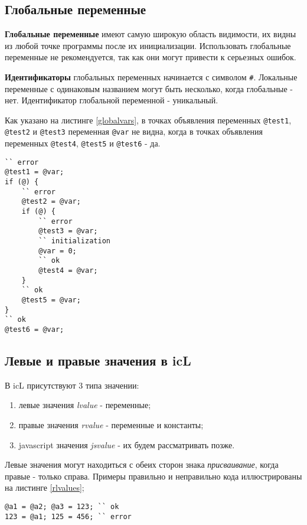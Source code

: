 \documentclass[a4paper, 14pt]{extarticle}
\newenvironment{icEnum}
	{ \begin{enumerate}[noitemsep,nolistsep] }
	{ \end{enumerate} }
\begin{document}
\subsection{Глобальные переменные}

\textbf{Глобальные переменные} имеют самую широкую область видимости, их видны из любой точке программы после их инициализации. Использовать глобальные переменные не рекомендуется, так как они могут привести к серьезных ошибок.

{\bf Идентификаторы} глобальных переменных начинается с символом {\color{blue2}\lstinline`#`}. Локальные переменные с одинаковым названием могут быть несколько, когда глобальные - нет. Идентификатор глобальной переменной - уникальный.

Как указано на листинге \ref{globalvars}, в точках объявления переменных \lstinline`@test1`, \lstinline`@test2` и \lstinline`@test3` переменная \lstinline`@var` не видна, когда в точках объявления переменных \lstinline`@test4`, \lstinline`@test5` и \lstinline`@test6` - да.

\begin{lstlisting}[caption=Область видимости глобальных перемен, label=globalvars]
`` error
@test1 = @var;
if (@) {
	`` error
	@test2 = @var;
	if (@) {
		`` error
		@test3 = @var;
		`` initialization
		@var = 0;
		`` ok
		@test4 = @var;
	}
	`` ok
	@test5 = @var;
}
`` ok
@test6 = @var;
\end{lstlisting}

\subsection{Левые и правые значения в icL}

В icL присутствуют 3 типа значении:

\begin{icEnum}
\item
	левые значения {\it lvalue} - переменные;
\item
	правые значения {\it rvalue} - переменные и константы;
\item
	javascript значения {\it jsvalue} - их будем рассматривать позже.
\end{icEnum}

Левые значения могут находиться с обеих сторон знака {\it присваивание}, когда правые - только справа. Примеры правильно и неправильно кода иллюстрированы на листинге \ref{rlvalues};

\begin{lstlisting}[caption=Левые и правые значения, label=rlvalues]
@a1 = @a2; @a3 = 123; `` ok
123 = @a1; 125 = 456; `` error
\end{lstlisting}
\end{document}
